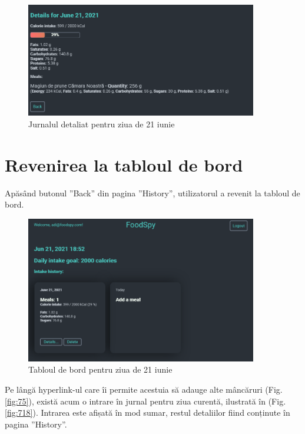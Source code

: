 \begin{figure}[!htb]
	\centering
	\includegraphics[width=0.9\textwidth]
	{../LaTeX/Images/App/history.PNG}
	\caption{Jurnalul detaliat pentru ziua de 21 iunie}
	\label{fig:716}
\end{figure}


\section{Revenirea la tabloul de bord}
Apăsând butonul ”Back” din pagina ”History”, utilizatorul a revenit la tabloul de bord.

\begin{figure}[!htb]
	\centering
	\includegraphics[width=0.9\textwidth]
	{../LaTeX/Images/App/history_result.PNG}
	\caption{Tabloul de bord pentru ziua de 21 iunie}
	\label{fig:717}
\end{figure}

Pe lângă hyperlink-ul care îi permite acestuia să adauge alte mâncăruri (Fig. \ref{fig:75}), există acum o intrare în jurnal pentru ziua curentă, ilustrată în (Fig. \ref{fig:718}). Intrarea este afișată în mod sumar, restul detaliilor fiind conținute în pagina ”History”.

